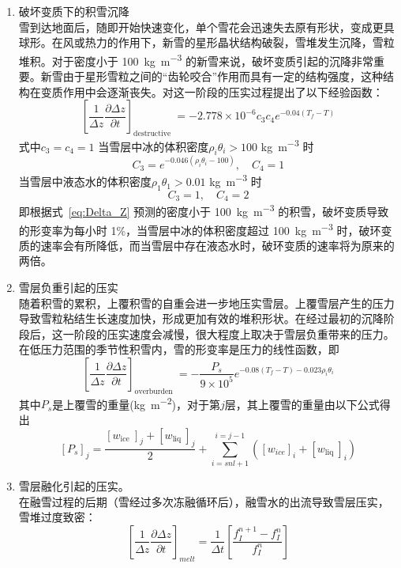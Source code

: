\begin{enumerate}
\item 破坏变质下的积雪沉降\\
雪到达地面后，随即开始快速变化，单个雪花会迅速失去原有形状，变成更具球形。在风或热力的作用下，新雪的星形晶状结构破裂，雪堆发生沉降，雪粒堆积。对于密度小于 \qty{100}{kg.m^{-3}} 的新雪来说，破坏变质引起的沉降非常重要。新雪由于星形雪粒之间的“齿轮咬合”作用而具有一定的结构强度，这种结构在变质作用中会逐渐丧失。\citet{anderson1976point}对这一阶段的压实过程提出了以下经验函数：
\begin{equation}\label{eq:Delta_Z}
\left[\frac{1}{\Delta {z}} \frac{\partial \Delta {z}}{\partial {t}}\right]_{\text {destructive }}=-2.778 \times 10^{-6} {c}_{3} {c}_{4} {e}^{-0.04\left(T_f-T\right)}
\end{equation}
式中${c}_{3}={c}_{4}=1$
当雪层中冰的体积密度$\rho_{i} \theta_{i}>100$ \unit{kg.m^{-3}} 时
\begin{equation}
{C}_{3}={e}^{-0.046\left(\rho_{{i}} \theta_{{i}}-100\right)}, \quad {C}_{4}=1
\end{equation}
当雪层中液态水的体积密度$\rho_{1} \theta_{1}>0.01$ \unit{kg.m^{-3}} 时
\begin{equation}
{C}_{3}=1,\quad  {C}_{4}=2
\end{equation}
即根据式~\eqref{eq:Delta_Z} 预测的密度小于 \qty{100}{kg.m^{-3}} 的积雪，破坏变质导致的形变率为每小时 1\%，当雪层中冰的体积密度超过 \qty{100}{kg.m^{-3}} 时，破环变质的速率会有所降低，而当雪层中存在液态水时，破环变质的速率将为原来的两倍。

\item 雪层负重引起的压实\\
随着积雪的累积，上覆积雪的自重会进一步地压实雪层。上覆雪层产生的压力导致雪粒粘结生长速度加快，形成更加有效的堆积形状。在经过最初的沉降阶段后，这一阶段的压实速度会减慢，很大程度上取决于雪层负重带来的压力。在低压力范围的季节性积雪内，雪的形变率是压力的线性函数，即
\begin{equation}
\left[\frac{1}{\Delta {z}} \frac{\partial \Delta {z}}{\partial {t}}\right]_{\text {overburden }}=-\frac{{P}_{{s}}}{9 \times 10^{5}} {e}^{-0.08\left(T_f-{T}\right)-0.023 \rho_{{i}} \theta_{{i}}}
\end{equation}
其中$P_{s}$是上覆雪的重量(\unit{kg.m^{-2}})，对于第$j$层，其上覆雪的重量由以下公式得出
\begin{equation}
\left[P_{s}\right]_{j}=\frac{\left[w_{\text {ice }}\right]_{j}+\left[w_{\text {liq }}\right]_{j}}{2}+\sum_{{i}={snl}+1}^{{i}={j}-1}\left(\left[{w}_{{ice}}\right]_{{i}}+\left[{w}_{\text {liq }}\right]_{{i}}\right)
\end{equation}

\item 雪层融化引起的压实。\\
在融雪过程的后期（雪经过多次冻融循环后），融雪水的出流导致雪层压实，雪堆过度致密：
\begin{equation}
\left[\frac{1}{\Delta {z}} \frac{\partial \Delta {z}}{\partial {t}}\right]_{{melt}}=\frac{1}{\Delta {t}}\left[\frac{{f}_{{I}}^{{n}+1}-{f}_{{I}}^{{n}}}{{f}_{{I}}^{{n}}}\right]
\end{equation}
\end{enumerate}
